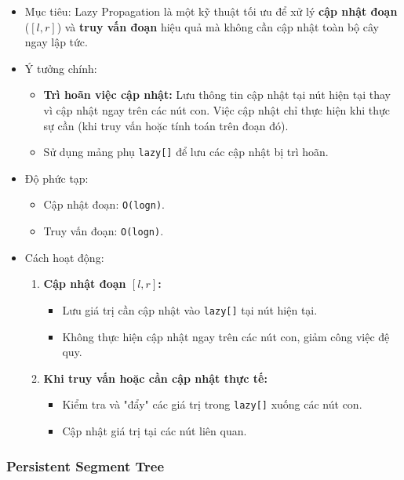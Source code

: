 \documentclass[a4paper]{article}
\begin{document}
\begin{itemize}[label = $\circ$]
    \item Mục tiêu: Lazy Propagation là một kỹ thuật tối ưu để xử lý \textbf{cập nhật đoạn} (\([l, r]\)) và \textbf{truy vấn đoạn} hiệu quả mà không cần cập nhật toàn bộ cây ngay lập tức.
    \item Ý tưởng chính: 
        \begin{itemize} [label = $\bullet$]
            \item \textbf{Trì hoãn việc cập nhật:} Lưu thông tin cập nhật tại nút hiện tại thay vì cập nhật ngay trên các nút con. Việc cập nhật chỉ thực hiện khi thực sự cần (khi truy vấn hoặc tính toán trên đoạn đó).
            \item Sử dụng mảng phụ \texttt{lazy[]} để lưu các cập nhật bị trì hoãn.
        \end{itemize}
    \item Độ phức tạp:
    \begin{itemize}[label = $\bullet$]
        \item Cập nhật đoạn: \texttt{O(logn)}.
        \item Truy vấn đoạn: \texttt{O(logn)}.
    \end{itemize}
    \item Cách hoạt động: 
        \begin{enumerate}
            \item \textbf{Cập nhật đoạn \([l, r]\):}
            \begin{itemize} [label = $\bullet$]
                \item Lưu giá trị cần cập nhật vào \texttt{lazy[]} tại nút hiện tại.
                \item Không thực hiện cập nhật ngay trên các nút con, giảm công việc đệ quy.
            \end{itemize}
            \item \textbf{Khi truy vấn hoặc cần cập nhật thực tế:}
            \begin{itemize} [label = $\bullet$]
                \item Kiểm tra và "đẩy" các giá trị trong \texttt{lazy[]} xuống các nút con.
                \item Cập nhật giá trị tại các nút liên quan.
            \end{itemize}
        \end{enumerate}    
\end{itemize}

\subsubsection{Persistent Segment Tree}
\end{document}
